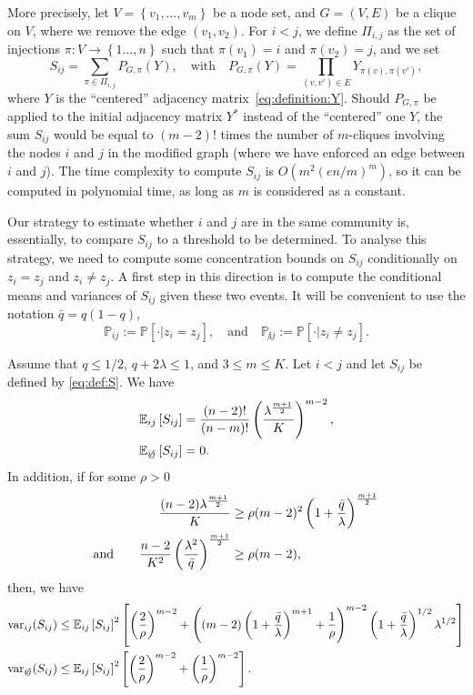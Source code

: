 \documentclass[final]{colt2026}
\newcommand{\1}{\mathbf{1}}
\newcommand{\bbE}{\mathbb{E}}
\newcommand{\bbP}{\mathbb{P}}
\newcommand{\pa}[1]{\left(#1\right)}
\newcommand{\ac}[1]{\left\{#1\right\}}
\newcommand{\cro}[1]{\left[#1\right]}
\begin{document}
More precisely, let $V=\ac{v_{1},\ldots,v_{m}}$ be a node set, and 
 $G=(V,E)$ be a clique on $V$, where we remove the edge $(v_{1},v_{2})$. 
For $i< j$, we define $\Pi_{i,j}$ as the set of injections $\pi:V\to \ac{1\ldots,n}$ such that $\pi(v_{1})=i$ and $\pi(v_{2})=j$, and we set
\begin{equation}\label{eq:def:S}
S_{ij}=\sum_{\pi \in \Pi_{i,j}} P_{G,\pi}(Y),\quad \text{with}\quad P_{G,\pi}(Y)=\prod_{(v,v')\in E}Y_{\pi(v),\pi(v')},
\end{equation}
where $Y$ is the ``centered'' adjacency matrix~\eqref{eq:definition:Y}.
Should $P_{G,\pi}$ be applied to the initial adjacency matrix $Y^*$ instead of the ``centered'' one $Y$, the sum  $S_{ij}$ would be equal to $(m-2)!$ times the number of $m$-cliques involving the nodes $i$ and $j$ in the modified graph (where we have enforced an edge between $i$ and $j$). 
The time complexity to compute $S_{ij}$ is  $O(m^2(en/m)^m)$, so it can be computed in polynomial time, as long as $m$ is considered as a constant.

Our strategy to estimate whether $i$ and $j$ are in the same community is, essentially, to compare $S_{ij}$ to a  threshold to be determined. To analyse this strategy, we need to compute some concentration bounds on $S_{ij}$ conditionally on $z_{i}=z_{j}$ and $z_{i}\neq z_{j}$. A first step in this direction is to compute the conditional means and variances of $S_{ij}$ given these two events. It will be convenient to use the notation $\bar q=q(1-q)$,
\begin{equation}\label{eq:conditional:P}
\bbP_{ij}:=\bbP\cro{\cdot|z_{i}=z_{j}},\quad\text{and}\quad \bbP_{\not ij}:=\bbP\cro{\cdot|z_{i}\neq z_{j}}.
\end{equation}

\begin{proposition}\label{prop:mean:variance}
 Assume that $q\leq 1/2$, $q+2\lambda \leq 1$, and $3\leq m\leq K$.
Let $i<j$ and let $S_{ij}$ be defined by \eqref{eq:def:S}.
We have 
\begin{align}
\bbE_{ij}\cro{S_{ij}}&={(n-2)!\over (n-m)!} \pa{\lambda^{m+1\over 2} \over K}^{m-2}, \label{eq:mean:12:prop}\\
\bbE_{\not ij}\cro{S_{ij}}&= 0. \label{eq:mean:not12:prop}
\end{align}
In addition, if for some $\rho>0$
\begin{align}
{(n-2) \lambda^{{m+1 \over 2}}\over K} & \geq \rho (m-2)^2 \pa{1+{\bar q\over \lambda}}^{m+1\over 2} \label{eq:cond1}\\
 \text{and}\quad\quad{n-2\over K^2 }\pa{\lambda^2\over \bar q}^{{m+1\over 2}} & \geq \rho (m-2), \label{eq:cond2}
 \end{align}
then, we have
\begin{align}
\mathrm{var}_{ij}(S_{ij})  & \leq \bbE_{ij}\cro{S_{ij}}^{2}\cro{\pa{2\over \rho}^{m-2}+\pa{(m-2)\pa{1+{\bar q\over \lambda}}^{m+1}+{1\over \rho}}^{m-2}\pa{1+{\bar q\over \lambda}}^{1/2}\lambda^{1/2}}\label{eq:var:12:prop}\\
\mathrm{var}_{\not ij}(S_{ij}) &\leq \bbE_{ij}\cro{S_{ij}}^{2}\cro{\pa{2\over \rho}^{m-2}+\pa{{1\over \rho}}^{m-2}}.
\end{align}
\end{proposition}
\end{document}

